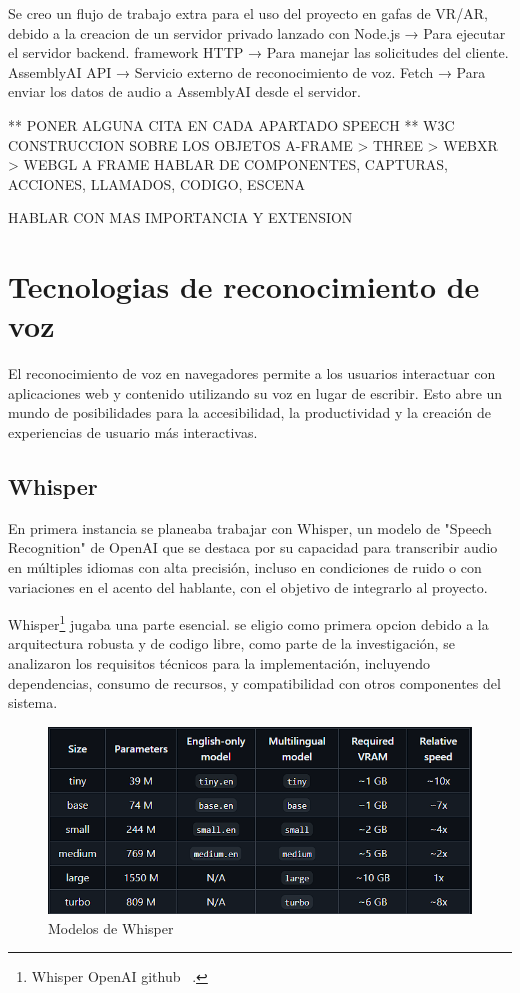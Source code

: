 \documentclass[a4paper, 12pt]{book}
\begin{document}
Se creo un flujo de trabajo extra para el uso del proyecto en gafas de VR/AR, debido a la creacion de un servidor privado lanzado con Node.js → Para ejecutar el servidor backend. framework HTTP → Para manejar las solicitudes del cliente. AssemblyAI API → Servicio externo de reconocimiento de voz. Fetch → Para enviar los datos de audio a AssemblyAI desde el servidor.

** PONER ALGUNA CITA EN CADA APARTADO
SPEECH 
    ** W3C
CONSTRUCCION SOBRE LOS OBJETOS
A-FRAME > THREE > WEBXR > WEBGL
A FRAME HABLAR DE COMPONENTES, CAPTURAS, ACCIONES, LLAMADOS, CODIGO, ESCENA

HABLAR CON MAS IMPORTANCIA Y EXTENSION 


\section{Tecnologias de reconocimiento de voz} 
\label{sec:seccion1}

El reconocimiento de voz en navegadores permite a los usuarios interactuar con aplicaciones web y contenido utilizando su voz en lugar de escribir. Esto abre un mundo  de posibilidades para la accesibilidad, la productividad y la creación de experiencias de usuario más interactivas.

\subsection{Whisper}

En primera instancia se planeaba trabajar con Whisper, un modelo de "Speech Recognition" de OpenAI que se destaca por su capacidad para transcribir audio en múltiples idiomas con alta precisión, incluso en condiciones de ruido o con variaciones en el acento del hablante, con el objetivo de integrarlo al proyecto.

Whisper\footnote{Whisper OpenAI github  ~\cite{whisper}.} jugaba una parte esencial. se eligio como primera opcion debido a la arquitectura robusta y de codigo libre, como parte de la investigación, se analizaron los requisitos técnicos para la implementación, incluyendo dependencias, consumo de recursos, y compatibilidad con otros componentes del sistema.

\begin{figure}[H]
    \centering
    \includegraphics[width=0.8\linewidth]{img/Whisper_github.png}
    \caption{Modelos de Whisper}
    \label{fig:models-Whisper}
\end{figure}
\end{document}

